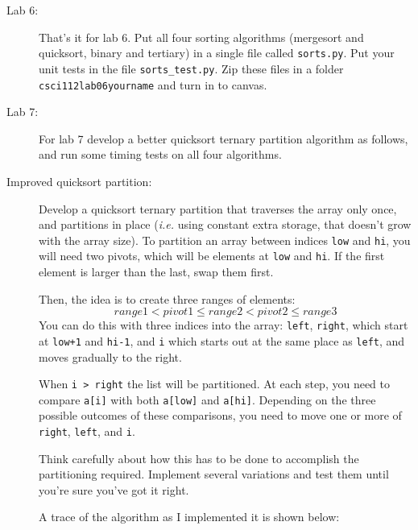 \documentclass{article}
\begin{document}
\begin{description}
\item[Lab 6:]  That's it for lab 6.   Put all four sorting algorithms (mergesort and quicksort, binary and
tertiary) in a single file called \verb|sorts.py|.  Put your unit tests in the file \verb|sorts_test.py|.  Zip these files in a folder \verb|csci112lab06yourname|
and turn in to canvas.

\item[Lab 7:]  For lab 7 develop a better quicksort ternary partition 
algorithm as follows, and run some timing tests on all four algorithms.

\item[Improved quicksort partition:] Develop a quicksort ternary partition that traverses
the array only once, and partitions in place ({\em i.e.} using constant extra storage,
that doesn't grow with the array size).  To partition
an array between indices \lstinline{low} and \lstinline{hi}, you will
need two pivots, which will be elements at \lstinline{low} and \lstinline{hi}.  If the
first element is larger than the last, swap them first.

Then, the idea is to create three ranges of elements:
\[ range1 < pivot1 \leq range2 < pivot2 \leq range3 \]
You can do this with three indices into the array: \lstinline{left}, \lstinline{right},
which start at \lstinline{low+1} and \lstinline{hi-1}, and \lstinline{i} which starts
out at the same place as \lstinline{left}, and moves gradually to the right.

When \lstinline{i > right} the list will be partitioned.  At each step,
you need to compare \lstinline{a[i]} with both \lstinline{a[low]}
and \lstinline{a[hi]}.  Depending on the three possible outcomes
of these comparisons, you need to move one or more of
\lstinline{right}, \lstinline{left}, and \lstinline{i}.

Think carefully about how this has to be done to accomplish the
partitioning required.  Implement several variations and test them
until you're sure you've got it right.

A trace of the algorithm as I implemented it is shown below:


\end{description}
\end{document}
